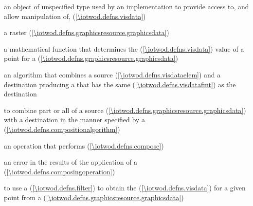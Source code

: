 %
%
 an object of unspecified type used by an implementation to provide access to, and allow manipulation of,  (\ref{\iotwod.defns.visdata})

\indexdefn{\pixmap}%
a raster  (\ref{\iotwod.defns.graphicsresource.graphicsdata})

%
a mathematical function that determines the  (\ref{\iotwod.defns.visdata}) value of a point for a  (\ref{\iotwod.defns.graphicsresource.graphicsdata})

%
an algorithm that combines a source  (\ref{\iotwod.defns.visdataelem}) and a destination  producing a  that has the same  (\ref{\iotwod.defns.visdatafmt}) as the destination 

%
to combine part or all of a source  (\ref{\iotwod.defns.graphicsresource.graphicsdata}) with a destination  in the manner specified by a  (\ref{\iotwod.defns.compositionalgorithm})

%
an operation that performs  (\ref{\iotwod.defns.compose})

%
an error in the results of the application of a  (\ref{\iotwod.defns.composingoperation})

%
to use a  (\ref{\iotwod.defns.filter}) to obtain the  (\ref{\iotwod.defns.visdata}) for a given point from a  (\ref{\iotwod.defns.graphicsresource.graphicsdata})

